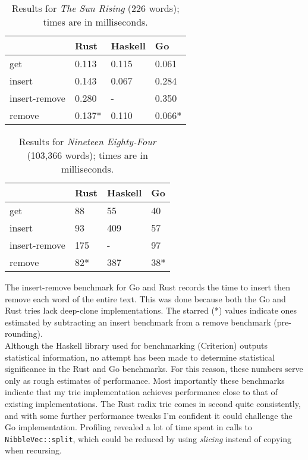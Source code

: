 \documentclass[a4paper,12pt]{article}
\newcommand{\code}[1]{\texttt{#1}}
\begin{document}
\begin{table}
\begin{center}
\begin{tabular}[h]{| l | l | l | l |}
\hline
                & \textbf{Rust} & \textbf{Haskell}  & \textbf{Go}   \\ \hline
get             & 0.113         & 0.115             & 0.061         \\ \hline
insert          & 0.143         & 0.067             & 0.284         \\ \hline
insert-remove   & 0.280         & -                 & 0.350         \\ \hline
remove          & 0.137*        & 0.110             & 0.066*        \\ \hline
\end{tabular}
\caption{Results for \textit{The Sun Rising} (226 words); times are in milliseconds.}
\end{center}
\end{table}

\begin{table}
\begin{center}
\begin{tabular}[h]{| l | l | l | l |}
\hline
                & \textbf{Rust} & \textbf{Haskell}  & \textbf{Go}   \\ \hline
get             & 88            &  55               & 40            \\ \hline
insert          & 93            &  409              & 57            \\ \hline
insert-remove   & 175           &  -                & 97            \\ \hline
remove          & 82*           &  387              & 38*           \\ \hline
\end{tabular}
\caption{Results for \textit{Nineteen Eighty-Four} (103,366 words); times are in milliseconds.}
\end{center}
\end{table}

The insert-remove benchmark for Go and Rust records the time to insert then remove each word of the entire text. This was done because both the Go and Rust tries lack deep-clone implementations. The starred (*) values indicate ones estimated by subtracting an insert benchmark from a remove benchmark (pre-rounding).\\

Although the Haskell library used for benchmarking (Criterion) outputs statistical information, no attempt has been made to determine statistical significance in the Rust and Go benchmarks. For this reason, these numbers serve only as rough estimates of performance. Most importantly these benchmarks indicate that my trie implementation achieves performance close to that of existing implementations. The Rust radix trie comes in second quite consistently, and with some further performance tweaks I'm confident it could challenge the Go implementation. Profiling revealed a lot of time spent in calls to \code{NibbleVec::split}, which could be reduced by using \textit{slicing} instead of copying when recursing.
\end{document}
